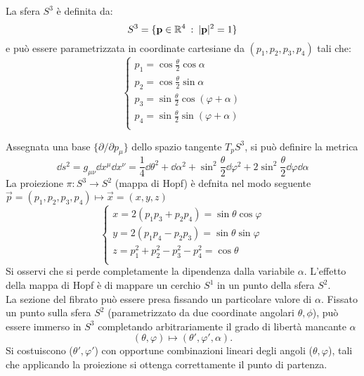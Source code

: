 La sfera $S^3$ è definita da:
$$ S^3 = \{ \mathbf{p} \in \mathbb{R}^4 \: : \: |\mathbf{p}|^2 = 1 \} $$
e può essere parametrizzata in coordinate cartesiane da $(p_1,p_2,p_3,p_4)$
tali che:
\begin{equation}
   \begin{cases}
      p_1 = \cos \frac{\theta}{2} \cos \alpha \\
      p_2 = \cos \frac{\theta}{2} \sin \alpha \\
      p_3 = \sin \frac{\theta}{2} \cos (\varphi  + \alpha) \\
      p_4 = \sin \frac{\theta}{2} \sin (\varphi  + \alpha) \\
   \end{cases}
\end{equation}

Assegnata una base $ \{ \partial/\partial p_\mu \} $ dello spazio tangente
$T_p S^3$, si può definire la metrica
\begin{equation}
   \dd  s^2 = g_{\mu\nu} \dd x^\mu \dd x^\nu
         = \frac{1}{4} \dd \theta^2 + \dd \alpha^2 + \sin^2\frac{\theta}{2}\dd \varphi ^2
         + 2\sin^2\frac{\theta}{2} \dd \varphi  \dd \alpha
\end{equation}
La proiezione $\pi : S^3 \to S^2$ (mappa di Hopf) è defnita nel modo seguente
$\vec p = (p_1,p_2,p_3,p_4) \mapsto \vec x = (x,y,z)$
\begin{equation}\label{eq:hopfmap}
   \begin{cases}
      x = 2(p_1 p_3 + p_2 p_4)          = \sin\theta \cos\varphi  \\
      y = 2(p_1 p_4 - p_2 p_3)          = \sin\theta \sin\varphi  \\
      z = p_1^2 + p_2^2 - p_3^2 - p_4^2 = \cos\theta          \\
   \end{cases}
\end{equation}
Si osservi che si perde completamente la dipendenza dalla variabile $\alpha$.
L'effetto della mappa di Hopf è di mappare un cerchio $S^1$ in un punto
della sfera $S^2$.\\

La sezione del fibrato può essere presa fissando un particolare valore di $ \alpha $.
Fissato un punto sulla sfera $ S^2 $ (parametrizzato da due coordinate angolari
$ \theta,\phi $), può essere immerso in $ S^3 $ completando arbitrariamente il grado
 di libertà mancante $\alpha$
$$
   (\theta,\varphi) \mapsto (\theta',\varphi',\alpha).
$$
Si costuiscono ($ \theta',\varphi' $) con opportune combinazioni lineari degli angoli
($ \theta, \varphi $), tali che applicando la proiezione si ottenga correttamente il
punto di partenza.\\


